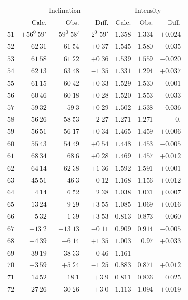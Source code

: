 \clearpage
{}
\begingroup
\fontsize{9}{10.2}\selectfont
\setlength{\tabcolsep}{2.5pt}
\renewcommand{\arraystretch}{1.02}
\begin{center}
\begin{tabular}{r||r|r|r||r|r|r}
\hline
&\multicolumn{3}{c||}{Inclination}&\multicolumn{3}{c}{Intensity}\\
&Calc.&Obs.&Diff.&Calc.&Obs.&Diff.\\\hline
$51$&$+56^0\;59'$&$+59^0\;58'$&$-2^0\;59'$&$1.358$&$1.334$&$+0.024$\\
$52$&$62\;31$&$61\;54$&$+0\;37$&$1.545$&$1.580$&$-0.035$\\
$53$&$61\;58$&$61\;22$&$+0\;36$&$1.539$&$1.559$&$-0.020$\\
$54$&$62\;13$&$63\;48$&$-1\;35$&$1.331$&$1.294$&$+0.037$\\
$55$&$61\;15$&$60\;42$&$+0\;33$&$1.529$&$1.530$&$-0.001$\\
$56$&$60\;46$&$60\;18$&$+0\;28$&$1.520$&$1.553$&$-0.033$\\
$57$&$59\;32$&$59\;3$&$+0\;29$&$1.502$&$1.538$&$-0.036$\\
$58$&$56\;26$&$58\;53$&$-2\;27$&$1.271$&$1.271$&$0.$\\
$59$&$56\;51$&$56\;17$&$+0\;34$&$1.465$&$1.459$&$+0.006$\\
$60$&$55\;43$&$54\;49$&$+0\;54$&$1.448$&$1.453$&$-0.005$\\[2pt]
$61$&$68\;34$&$68\;6$&$+0\;28$&$1.469$&$1.457$&$+0.012$\\
$62$&$64\;14$&$62\;38$&$+1\;36$&$1.592$&$1.591$&$+0.001$\\
$63$&$45\;51$&$46\;3$&$-0\;12$&$1.168$&$1.156$&$+0.012$\\
$64$&$4\;14$&$6\;52$&$-2\;38$&$1.038$&$1.031$&$+0.007$\\
$65$&$13\;24$&$9\;29$&$+3\;55$&$1.085$&$1.069$&$+0.016$\\
$66$&$5\;32$&$1\;39$&$+3\;53$&$0.813$&$0.873$&$-0.060$\\
$67$&$+13\;2$&$+13\;13$&$-0\;11$&$0.909$&$0.914$&$-0.005$\\
$68$&$-4\;39$&$-6\;14$&$+1\;35$&$1.003$&$0.97$&$+0.033$\\
$69$&$-39\;19$&$-38\;33$&$-0\;46$&$1.161$&&\\
$70$&$+3\;59$&$+5\;24$&$-1\;25$&$0.883$&$0.871$&$+0.012$\\[2pt]
$71$&$-14\;52$&$-18\;1$&$+3\;9$&$0.811$&$0.836$&$-0.025$\\
$72$&$-27\;26$&$-30\;26$&$+3\;0$&$1.113$&$1.094$&$+0.019$\\

\end{tabular}
\end{center}
